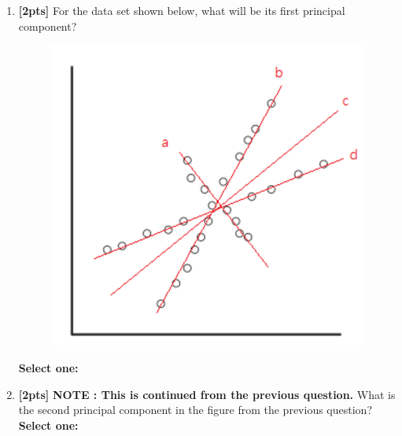 \documentclass[12pt]{article}
\renewcommand{\circle}{\tikz\draw[black] (0,0) circle (1ex);}
\begin{document}
\begin{enumerate}
    
    \item \textbf{[2pts]} For the data set shown below, what will be its first principal component? %
    \begin{figure}[H]
    \centering
    \includegraphics[width=0.65\linewidth]{figures/pca1.png}
    \end{figure}
    \newpage
    \textbf{Select one:}
    
    \item \textbf{[2pts]} \textbf{NOTE : This is continued from the previous question.} What is the second principal component in the figure from the previous question? %
    \textbf{Select one:}
\end{enumerate}
\end{document}
